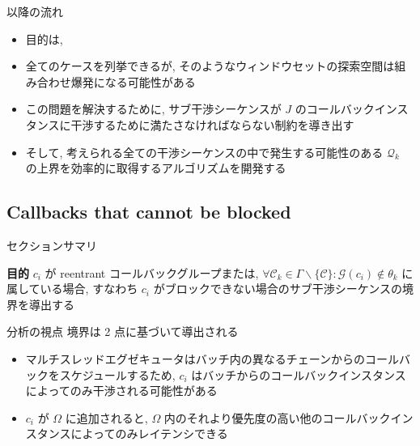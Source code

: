 \begin{frame}{以降の流れ}
    \begin{itemize}
        \item 目的は, \\ 
        \item 全てのケースを列挙できるが, そのようなウィンドウセットの探索空間は組み合わせ爆発になる可能性がある
        \item この問題を解決するために, サブ干渉シーケンスが $J$ のコールバックインスタンスに干渉するために満たさなければならない制約を導き出す
        \item そして, 考えられる全ての干渉シーケンスの中で発生する可能性のある $\mathcal{Q}_{k}$ の上界を効率的に取得するアルゴリズムを開発する
    \end{itemize}
\end{frame}


\subsection{Callbacks that cannot be blocked}
\label{ssec: callbacks_that_cannot_be_blocked}

\begin{frame}{セクションサマリ}
    \begin{itembox}[l]{\textbf{目的}}
        $c_{i}$ が reentrant コールバックグループまたは, $\forall \mathcal{C}_{k} \in \Gamma \backslash\{\mathcal{C}\}: \mathcal{G}\left(c_{i}\right) \notin \theta_{k}$ に属している場合, すなわち $c_{i}$ がブロックできない場合のサブ干渉シーケンスの境界を導出する
    \end{itembox}
\end{frame}

\begin{frame}{分析の視点}
    境界は 2 点に基づいて導出される
    \begin{itemize}
        \item マルチスレッドエグゼキュータはバッチ内の異なるチェーンからのコールバックをスケジュールするため, $c_{i}$ はバッチからのコールバックインスタンスによってのみ干渉される可能性がある
        \item $c_{i}$ が $\Omega$ に追加されると, $\Omega$ 内のそれより優先度の高い他のコールバックインスタンスによってのみレイテンシできる
    \end{itemize}
\end{frame}

